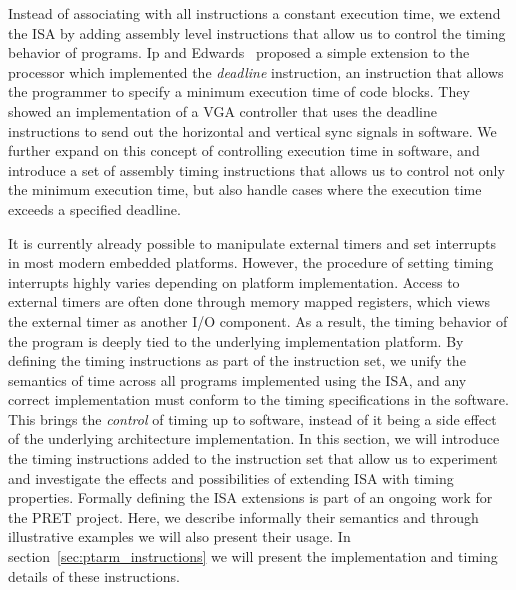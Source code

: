 Instead of associating with all instructions a constant execution time, we extend the ISA by adding assembly level instructions that allow us to control the timing behavior of programs. 
Ip and Edwards~\cite{ip2006processor} proposed a simple extension to the processor which implemented the \emph{deadline} instruction, an instruction that allows the programmer to specify a minimum execution time of code blocks.
They showed an implementation of a VGA controller that uses the deadline instructions to send out the horizontal and vertical sync signals in software.
We further expand on this concept of controlling execution time in software, and introduce a set of assembly timing instructions that allows us to 
control not only the minimum execution time, but also handle cases where the execution time exceeds a specified deadline.

It is currently already possible to manipulate external timers and set interrupts in most modern embedded platforms.
However, the procedure of setting timing interrupts highly varies depending on platform implementation.
Access to external timers are often done through memory mapped registers, which views the external timer as another I/O component.
As a result, the timing behavior of the program is deeply tied to the underlying implementation platform.
By defining the timing instructions as part of the instruction set, we unify the semantics of time across all programs implemented using the ISA, and any correct implementation must conform to the timing specifications in the software.
This brings the \emph{control} of timing up to software, instead of it being a side effect of the underlying architecture implementation.  
In this section, we will introduce the timing instructions added to the instruction set that allow us to experiment and investigate the effects and possibilities of extending ISA with timing properties.
Formally defining the ISA extensions is part of an ongoing work for the PRET project.
Here, we describe informally their semantics and through illustrative examples we will also present their usage. 
In section~\ref{sec:ptarm_instructions} we will present the implementation and timing details of these instructions.

